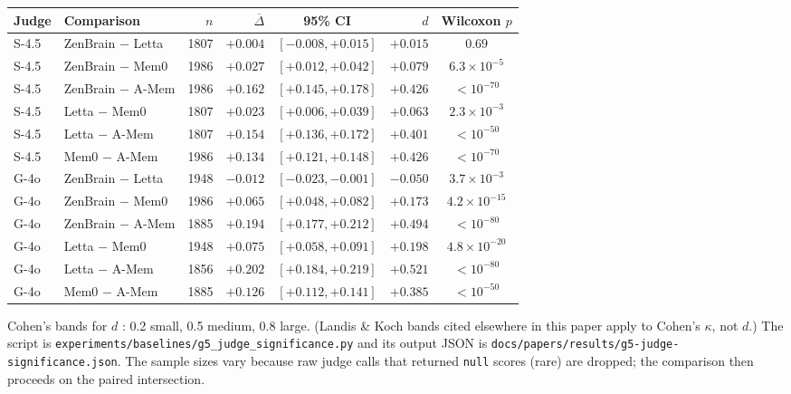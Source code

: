 \documentclass{article}
\begin{document}
\begin{center}
\small
\begin{tabular}{llrrcrc}
\toprule
Judge & Comparison & $n$ & $\overline{\Delta}$ & 95\% CI & $d$ & Wilcoxon $p$ \\
\midrule
S-4.5 & ZenBrain $-$ Letta  & 1807 & $+0.004$ & $[-0.008, +0.015]$ & $+0.015$ & $0.69$            \\
S-4.5 & ZenBrain $-$ Mem0   & 1986 & $+0.027$ & $[+0.012, +0.042]$ & $+0.079$ & $6.3 \times 10^{-5}$  \\
S-4.5 & ZenBrain $-$ A-Mem  & 1986 & $+0.162$ & $[+0.145, +0.178]$ & $+0.426$ & $< 10^{-70}$      \\
S-4.5 & Letta $-$ Mem0      & 1807 & $+0.023$ & $[+0.006, +0.039]$ & $+0.063$ & $2.3 \times 10^{-3}$  \\
S-4.5 & Letta $-$ A-Mem     & 1807 & $+0.154$ & $[+0.136, +0.172]$ & $+0.401$ & $< 10^{-50}$      \\
S-4.5 & Mem0  $-$ A-Mem     & 1986 & $+0.134$ & $[+0.121, +0.148]$ & $+0.426$ & $< 10^{-70}$      \\
\midrule
G-4o  & ZenBrain $-$ Letta  & 1948 & $-0.012$ & $[-0.023, -0.001]$ & $-0.050$ & $3.7 \times 10^{-3}$  \\
G-4o  & ZenBrain $-$ Mem0   & 1986 & $+0.065$ & $[+0.048, +0.082]$ & $+0.173$ & $4.2 \times 10^{-15}$ \\
G-4o  & ZenBrain $-$ A-Mem  & 1885 & $+0.194$ & $[+0.177, +0.212]$ & $+0.494$ & $< 10^{-80}$      \\
G-4o  & Letta $-$ Mem0      & 1948 & $+0.075$ & $[+0.058, +0.091]$ & $+0.198$ & $4.8 \times 10^{-20}$ \\
G-4o  & Letta $-$ A-Mem     & 1856 & $+0.202$ & $[+0.184, +0.219]$ & $+0.521$ & $< 10^{-80}$      \\
G-4o  & Mem0 $-$ A-Mem      & 1885 & $+0.126$ & $[+0.112, +0.141]$ & $+0.385$ & $< 10^{-50}$      \\
\bottomrule
\end{tabular}
\end{center}

Cohen's bands for $d$ \citep{cohen1988statistical}: 0.2 small, 0.5 medium, 0.8 large.
(Landis \& Koch \citep{landis1977} bands cited elsewhere in this paper apply to Cohen's $\kappa$, not $d$.)
The script is \texttt{experiments/baselines/g5\_judge\_significance.py}
and its output JSON is
\texttt{docs/papers/results/g5-judge-significance.json}.
The sample sizes vary because raw judge calls that returned
\texttt{null} scores (rare) are dropped; the comparison then proceeds
on the paired intersection.
\end{document}
